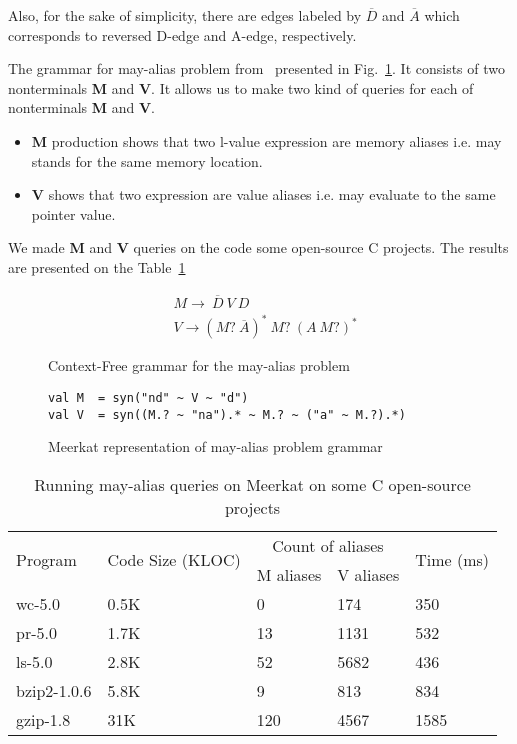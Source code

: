 Also, for the sake of simplicity, there are edges labeled by $\overline{D}$ and $\overline{A}$ which corresponds to reversed D-edge and A-edge, respectively.

The grammar for may-alias problem from~\cite{Zheng} presented in Fig.~\ref{lst:aliasGrammar}.
It consists of two nonterminals \textbf{M} and \textbf{V}.
It allows us to make two kind of queries for each of nonterminals \textbf{M} and \textbf{V}.

\begin{itemize}
    \item \textbf{M} production shows that two l-value expression are memory aliases i.e. may stands for the same memory location.
    \item \textbf{V} shows that two expression are value aliases i.e. may evaluate to the same pointer value.
\end{itemize}

We made \textbf{M} and \textbf{V} queries on the code some open-source C projects.
The results are presented on the Table~\ref{table:staticAnalysis} 

\begin{figure}[t]
\begin{align*}
& M \rightarrow\ \overline{D}\ V\ D\\
& V \rightarrow (M ?\ \overline{A})^{*} \ M?\ (A\ M?)^{*}
\end{align*}
\caption{Context-Free grammar for the may-alias problem}
\label{lst:aliasGrammar}
\end{figure}

\begin{figure}[h]
\begin{lstlisting}
val M  = syn("nd" ~ V ~ "d")
val V  = syn((M.? ~ "na").* ~ M.? ~ ("a" ~ M.?).*)
\end{lstlisting}
\caption{Meerkat representation of may-alias problem grammar}
\label{fig:aliasMeerkat}
\end{figure}


\begin{table}[t]
\centering
\begin{tabular}{|l|l|ll|l|}
\hline
\multirow{2}{*}{Program} & \multirow{2}{*}{Code Size (KLOC)} & \multicolumn{2}{c|}{Count of aliases} & \multirow{2}{*}{Time (ms)} \\ \cline{3-4}
 &  & \multicolumn{1}{c|}{M aliases} & \multicolumn{1}{c|}{V aliases} &  \\ 
\hline
\hline
wc-5.0      & 0.5K & 0   & 174  & 350 \\
pr-5.0      & 1.7K & 13  & 1131 & 532 \\
ls-5.0      & 2.8K & 52  & 5682 & 436 \\
bzip2-1.0.6 & 5.8K & 9   & 813  & 834 \\
gzip-1.8    & 31K  & 120 & 4567 & 1585\\
\hline
\end{tabular}
\caption{Running may-alias queries on Meerkat on some C open-source projects}
\label{table:staticAnalysis}
\end{table}

